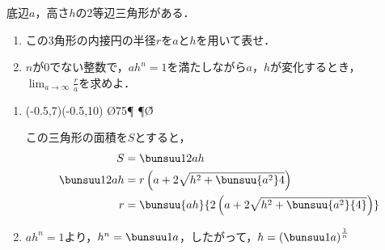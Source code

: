 \begin{problem}
  底辺$a$，高さ$h$の2等辺三角形がある．
\begin{enumerate}
\item この3角形の内接円の半径$r$を$a$と$h$を用いて表せ．
\item $n$が0でない整数で，$ah^n=1$を満たしながら$a$，$h$が変化するとき，
$\displaystyle\lim_{a\to\infty}\frac{r}{a}$を求めよ．
\end{enumerate}
\end{problem}



\begin{enumerate}
  \item
  \begin{mawarikomi}{}{
\begin{pszahyou*}[ul=4mm](-0.5,7)(-0.5,10)
  \kandk\O{75}\P
  \Suisen\P\O\A\H
  \Takakkei{\O\A\P}
  \Drawline{\P\H}
\end{pszahyou*}}
この三角形の面積を$S$とすると，
\begin{align*}
  S &= \bunsuu12ah \\
  \bunsuu12ah &= r\left(a + 2\sqrt{h^2 + \bunsuu{a^2}4}\right) \\
  r &= \bunsuu{ah}{2\left(a + 2\sqrt{h^2 + \bunsuu{a^2}{4}}\right)}
\end{align*}
\end{mawarikomi}

\item $ah^n = 1$より，$h^n = \bunsuu1a$，したがって，$h = \left(\bunsuu1a\right)^{\frac1{n}}$

\end{enumerate}
